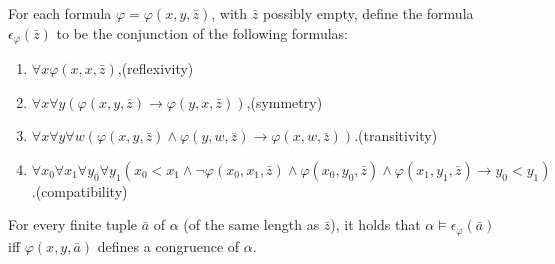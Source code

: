 \begin{prp}\label{prp:dcform}
	For each formula $\varphi=\varphi(x,y,\bar{z})$, with $\bar{z}$ possibly empty, define the formula $\epsilon_\varphi(\bar{z})$ to be the conjunction of the following formulas:
	\begin{enumerate}
		\item	$\forall x\varphi(x,x,\bar{z})$,\hfill(reflexivity)
		\item	$\forall x\forall y(\varphi(x,y,\bar{z})\rightarrow\varphi(y,x,\bar{z}))$,\hfill (symmetry)
		\item 	$\forall x\forall y\forall w(\varphi(x,y,\bar{z})\wedge\varphi(y,w,\bar{z})\rightarrow\varphi(x,w,\bar{z}))$.\hfill (transitivity)
		\item 	$\forall x_0\forall x_1\forall y_0\forall y_1(x_0<x_1\wedge\neg\varphi(x_0,x_1,\bar{z})\wedge\varphi(x_0,y_0,\bar{z})\wedge\varphi(x_1,y_1,\bar{z})\rightarrow y_0<y_1)$.\phantom{}\hfill(compatibility)
	\end{enumerate}
	For every finite tuple $\bar{a}$ of $\alpha$ (of the same length as $\bar{z}$), it holds that $\alpha\models\epsilon_\varphi(\bar{a})$ iff $\varphi(x,y,\bar{a})$ defines a congruence of $\alpha$.
\end{prp}

